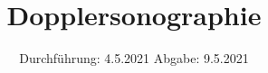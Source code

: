 

\subject{US3}
\title{Dopplersonographie}
\date{%
  Durchführung: 4.5.2021
  \hspace{3em}
  Abgabe: 9.5.2021
}



\maketitle
\thispagestyle{empty}
\tableofcontents
\newpage







\nocite{}
\printbibliography{}


